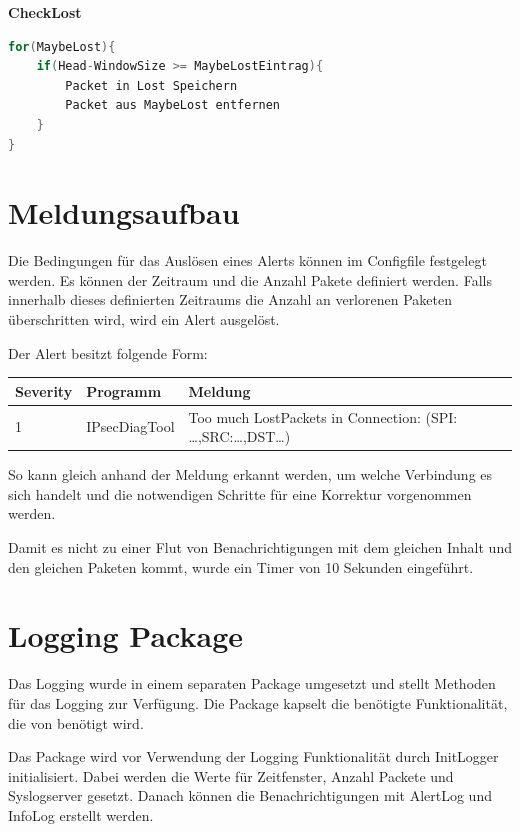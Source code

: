 \textbf{CheckLost}
\begin{lstlisting}[language=go]
for(MaybeLost){
	if(Head-WindowSize >= MaybeLostEintrag){
		Packet in Lost Speichern
		Packet aus MaybeLost entfernen
	}
}
\end{lstlisting}


\section{ Meldungsaufbau}

\noindent Die Bedingungen für das Auslösen eines Alerts können im Configfile festgelegt werden. Es können der Zeitraum und die Anzahl Pakete definiert werden. Falls innerhalb dieses definierten Zeitraums die Anzahl an verlorenen Paketen überschritten wird, wird ein Alert ausgelöst.

\noindent Der Alert besitzt folgende Form:

\begin{tabular}{|p{0.5in}|p{0.7in}|p{3.0in}|} \hline 
Severity & Programm & Meldung \\ \hline 
1 & IPsecDiagTool & Too much LostPackets in Connection: (SPI: \dots ,SRC:\dots ,DST\dots ) \\ \hline 
\end{tabular}


\noindent So kann gleich anhand der Meldung erkannt werden, um welche Verbindung es sich handelt und die notwendigen Schritte für eine Korrektur vorgenommen werden.

\noindent Damit es nicht zu einer Flut von Benachrichtigungen mit dem gleichen Inhalt und den gleichen Paketen kommt, wurde ein Timer von 10 Sekunden eingeführt.

\section{ Logging Package}

\noindent Das Logging wurde in einem separaten Package umgesetzt und stellt Methoden für das Logging zur Verfügung. Die Package kapselt die benötigte Funktionalität, die von  benötigt wird.

\noindent Das Package wird vor Verwendung der Logging Funktionalität durch InitLogger initialisiert. Dabei werden die Werte für Zeitfenster, Anzahl Packete und Syslogserver gesetzt. Danach können die Benachrichtigungen mit AlertLog und InfoLog erstellt werden.

